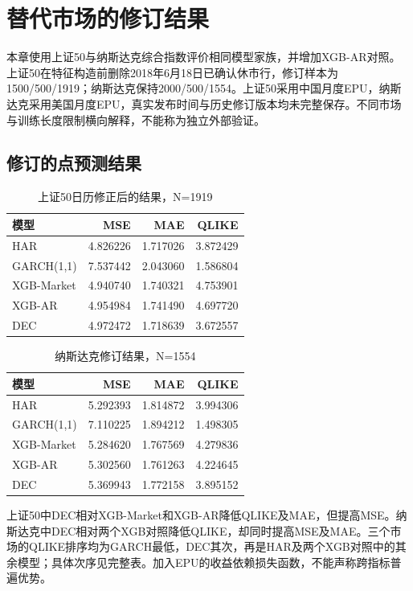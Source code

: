 \section{替代市场的修订结果}
本章使用上证50与纳斯达克综合指数评价相同模型家族，并增加XGB-AR对照。上证50在特征构造前删除2018年6月18日已确认休市行，修订样本为1500/500/1919；纳斯达克保持2000/500/1554。上证50采用中国月度EPU，纳斯达克采用美国月度EPU，真实发布时间与历史修订版本均未完整保存。不同市场与训练长度限制横向解释，不能称为独立外部验证。

\subsection{修订的点预测结果}
\begin{table}[htbp]\centering\caption{上证50日历修正后的结果，N=1919}\label{tab:sse50_metrics}
\begin{tabular}{lrrr}\toprule
模型 & MSE & MAE & QLIKE \\
\midrule
HAR & 4.826226 & 1.717026 & 3.872429 \\
GARCH(1,1) & 7.537442 & 2.043060 & 1.586804 \\
XGB-Market & 4.940740 & 1.740321 & 4.753901 \\
XGB-AR & 4.954984 & 1.741490 & 4.697720 \\
DEC & 4.972472 & 1.718639 & 3.672557 \\
\bottomrule\end{tabular}\end{table}
\begin{table}[htbp]\centering\caption{纳斯达克修订结果，N=1554}\label{tab:nas_metrics}
\begin{tabular}{lrrr}\toprule
模型 & MSE & MAE & QLIKE \\
\midrule
HAR & 5.292393 & 1.814872 & 3.994306 \\
GARCH(1,1) & 7.110225 & 1.894212 & 1.498305 \\
XGB-Market & 5.284620 & 1.767569 & 4.279836 \\
XGB-AR & 5.302560 & 1.761263 & 4.224645 \\
DEC & 5.369943 & 1.772158 & 3.895152 \\
\bottomrule\end{tabular}\end{table}

上证50中DEC相对XGB-Market和XGB-AR降低QLIKE及MAE，但提高MSE。纳斯达克中DEC相对两个XGB对照降低QLIKE，却同时提高MSE及MAE。三个市场的QLIKE排序均为GARCH最低，DEC其次，再是HAR及两个XGB对照中的其余模型；具体次序见完整表。加入EPU的收益依赖损失函数，不能声称跨指标普遍优势。


